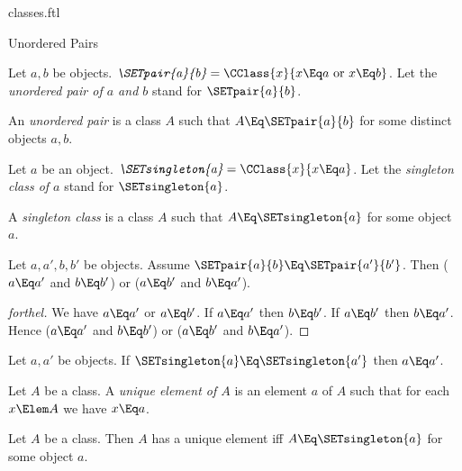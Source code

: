 \documentclass{stex}
\begin{document}
\begin{smodule}{classes.ftl}
\begin{sfragment}{Unordered Pairs}
  \begin{definition}[forthel]
    Let $a, b$ be objects.
    $\emph{\SETpair{a}{b}} = \CClass{x}{x \Eq a\text{ or }x \Eq b}$.
    Let the \emph{unordered pair of $a$ and $b$} stand for $\SETpair{a}{b}$.
  \end{definition}

  \begin{definition}[forthel]
    An \emph{unordered pair} is a class $A$ such that $A \Eq \SETpair{a}{b}$ for some distinct objects $a, b$.
  \end{definition}

  \begin{definition}[forthel]
    Let $a$ be an object.
    $\emph{\SETsingleton{a}} = \CClass{x}{x \Eq a}$.
    Let the \emph{singleton class of $a$} stand for $\SETsingleton{a}$.
  \end{definition}

  \begin{definition}[forthel]
    A \emph{singleton class} is a class $A$ such that $A \Eq \SETsingleton{a}$ for some object $a$.
  \end{definition}

  \begin{proposition}[forthel]
    Let $a, a', b, b'$ be objects.
    Assume $\SETpair{a}{b} \Eq \SETpair{a'}{b'}$.
    Then ($a \Eq a'$ and $b \Eq b'$) or ($a \Eq b'$ and $b \Eq a'$).
  \end{proposition}
  \begin{proof}[forthel]
    We have $a \Eq a'$ or $a \Eq b'$.
    If $a \Eq a'$ then $b \Eq b'$.
    If $a \Eq b'$ then $b \Eq a'$.
    Hence ($a \Eq a'$ and $b \Eq b'$) or ($a \Eq b'$ and $b \Eq a'$).
  \end{proof}

  \begin{corollary}[forthel]
    Let $a, a'$ be objects.
    If $\SETsingleton{a} \Eq \SETsingleton{a'}$ then $a \Eq a'$.
  \end{corollary}

  \begin{definition}[forthel]
    Let $A$ be a class.
    A \emph{unique element of $A$} is an element $a$ of $A$ such that for each $x \Elem A$ we have $x \Eq a$.
  \end{definition}

  \begin{proposition}[forthel]
    Let $A$ be a class.
    Then $A$ has a unique element iff $A \Eq \SETsingleton{a}$ for some object $a$.
  \end{proposition}
\end{sfragment}


\end{smodule}
\end{document}
